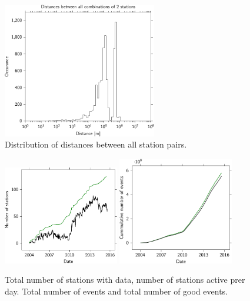 \begin{figure}
    \centering
    \includegraphics[width=0.6\textwidth]
                    {plots/experiment/network_station_distances}
    \caption{Distribution of distances between all station pairs.}
    \label{fig:network-distances}
\end{figure}


\begin{figure}
    \centering
    \includegraphics[width=0.45\textwidth]
                    {plots/experiment/active_stations}
    \includegraphics[width=0.45\textwidth]
                    {plots/experiment/luminosity_network}
    \caption{Total number of stations with data, number of stations active prer day. Total number of events and total number of good events.}
    \label{fig:active-luminosity}
\end{figure}



